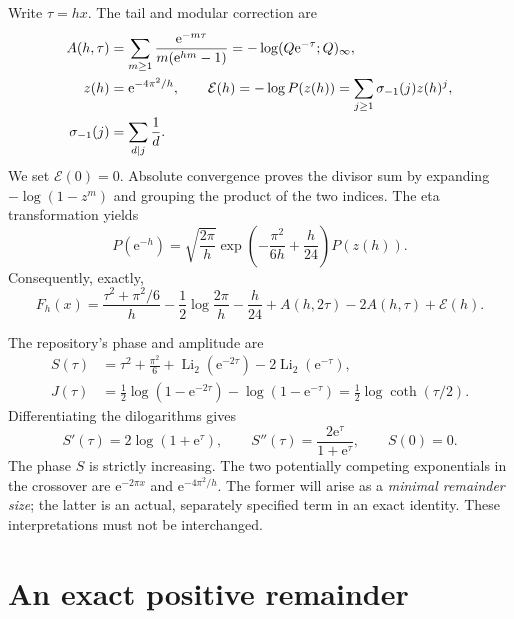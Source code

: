 \documentclass[11pt,a4paper]{article}
\theoremstyle{definition}
\theoremstyle{remark}
\newcommand{\e}{\mathrm e}
\newcommand{\Li}{\operatorname{Li}}
\newcommand{\Ecal}{\mathcal E}
\begin{document}
Write $\tau=hx$. The tail and modular correction are
\begin{align}
 A(h,\tau)&=\sum_{m\ge1}\frac{\e^{-m\tau}}{m(\e^{hm}-1)}
          =-\log(Q\e^{-\tau};Q)_\infty,\label{eq:A}\\
 z(h)&=\e^{-4\pi^2/h},\qquad
 \Ecal(h)=-\log P(z(h))
   =\sum_{j\ge1}\sigma_{-1}(j)z(h)^j,\label{eq:modular}\\
 \sigma_{-1}(j)&=\sum_{d\mid j}\frac1d.\notag
\end{align}
We set $\Ecal(0)=0$. Absolute convergence proves the divisor sum by
expanding $-\log(1-z^m)$ and grouping the product of the two indices.
The eta transformation \cite{dlmfeta} yields
\begin{equation}
 P(\e^{-h})=\sqrt{\frac{2\pi}{h}}
 \exp\!\left(-\frac{\pi^2}{6h}+\frac h{24}\right)P(z(h)).
 \label{eq:eta}
\end{equation}
Consequently, exactly,
\begin{equation}
 F_h(x)=\frac{\tau^2+\pi^2/6}{h}
 -\frac12\log\frac{2\pi}{h}-\frac h{24}
 +A(h,2\tau)-2A(h,\tau)+\Ecal(h).
 \label{eq:exactforward}
\end{equation}

The repository's phase and amplitude are
\begin{align}
 S(\tau)&=\tau^2+\frac{\pi^2}{6}
          +\Li_2(\e^{-2\tau})-2\Li_2(\e^{-\tau}),\label{eq:S}\\
 J(\tau)&=\frac12\log(1-\e^{-2\tau})-\log(1-\e^{-\tau})
          =\frac12\log\coth(\tau/2).\label{eq:J}
\end{align}
Differentiating the dilogarithms gives
\begin{equation}
 S'(\tau)=2\log(1+\e^\tau),\qquad
 S''(\tau)=\frac{2\e^\tau}{1+\e^\tau},\qquad S(0)=0.
 \label{eq:Sder}
\end{equation}
The phase $S$ is strictly increasing. The two potentially competing
exponentials in the crossover are $\e^{-2\pi x}$ and
$\e^{-4\pi^2/h}$. The former will arise as a \emph{minimal remainder size};
the latter is an actual, separately specified term in an exact identity.
These interpretations must not be interchanged.

\section{An exact positive remainder}
\label{sec:remainder}
\end{document}
